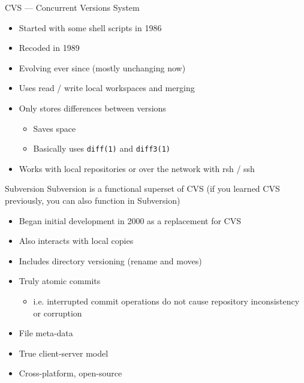 \documentclass[onlymath, nologo]{beamer}
\begin{document}
  \begin{frame}{CVS --- Concurrent Versions System}
    \begin{itemize}
      \item Started with some shell scripts in 1986 \\[0.5em]
      \item Recoded in 1989 \\[0.5em]
      \item Evolving ever since (mostly unchanging now) \\[0.5em]
      \item Uses read / write local workspaces and merging \\[0.5em]
      \item Only stores differences between versions \\[0.25em]
      \begin{itemize}
        \item Saves space
        \item Basically uses \texttt{diff(1)} and \texttt{diff3(1)}
      \end{itemize}
      \item Works with local repositories or over the network with rsh / ssh
    \end{itemize}
  \end{frame}

  \begin{frame}{Subversion}
    Subversion is a functional superset of CVS (if you learned CVS previously, you can 
    also function in Subversion)
    \begin{itemize}
      \item Began initial development in 2000 as a replacement for CVS \\[0.5em] 
      \item Also interacts with local copies \\[0.5em]
      \item Includes directory versioning (rename and moves) \\[0.5em]
      \item Truly atomic commits \\[0.25em]
      \begin{itemize}
        \item i.e. interrupted commit operations do not cause repository inconsistency 
              or corruption
      \end{itemize}
      \item File meta-data \\[0.5em]
      \item True client-server model \\[0.5em] 
      \item Cross-platform, open-source
    \end{itemize}
  \end{frame}
\end{document}
